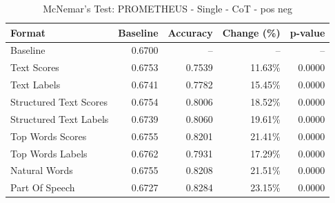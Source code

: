 \begin{table}[htbp]
\centering
\caption{McNemar's Test: PROMETHEUS - Single - CoT - pos neg}
\label{tab:prometheus-single-chain_of_thought_True-pos_neg}
\begin{tabular}{lrrrr}
\toprule
Format & Baseline & Accuracy & Change (\%) & p-value \\
\midrule
Baseline & 0.6700 & -- & -- & -- \\
Text Scores & 0.6753 & 0.7539 & 11.63\% & 0.0000 \\
Text Labels & 0.6741 & 0.7782 & 15.45\% & 0.0000 \\
Structured Text Scores & 0.6754 & 0.8006 & 18.52\% & 0.0000 \\
Structured Text Labels & 0.6739 & 0.8060 & 19.61\% & 0.0000 \\
Top Words Scores & 0.6755 & 0.8201 & 21.41\% & 0.0000 \\
Top Words Labels & 0.6762 & 0.7931 & 17.29\% & 0.0000 \\
Natural Words & 0.6755 & 0.8208 & 21.51\% & 0.0000 \\
Part Of Speech & 0.6727 & 0.8284 & 23.15\% & 0.0000 \\
\bottomrule
\end{tabular}
\end{table}